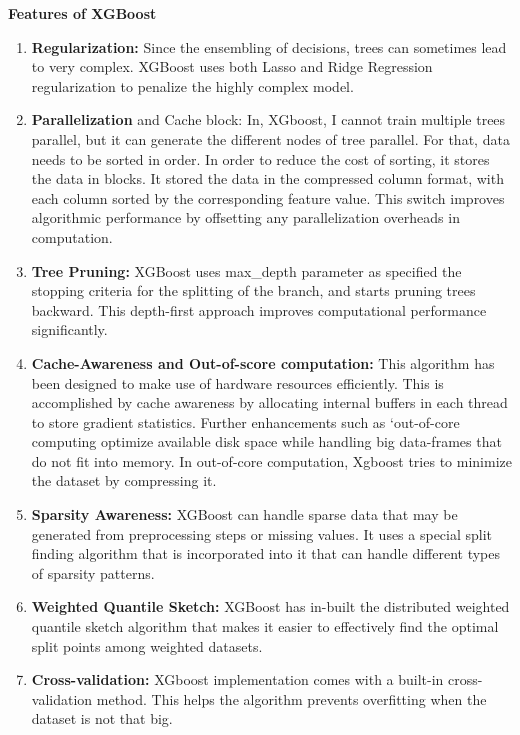 \documentclass[12pt]{article}
\begin{document}
\textbf{Features of XGBoost}
\begin{enumerate}
\item\textbf{Regularization:} Since the ensembling of decisions, trees can sometimes lead to very complex. XGBoost uses both Lasso and Ridge Regression regularization to penalize the highly complex model.
\item\textbf{Parallelization} and Cache block: In, XGboost, I cannot train multiple trees parallel, but it can generate the different nodes of tree parallel. For that, data needs to be sorted in order. In order to reduce the cost of sorting, it stores the data in blocks. It stored the data in the compressed column format, with each column sorted by the corresponding feature value. This switch improves algorithmic performance by offsetting any parallelization overheads in computation.
\item\textbf{Tree Pruning:}  XGBoost uses max\_depth parameter as specified the stopping criteria for the splitting of the branch, and starts pruning trees backward. This depth-first approach improves computational performance significantly.
\item\textbf{Cache-Awareness and Out-of-score computation:} This algorithm has been designed to make use of hardware resources efficiently. This is accomplished by cache awareness by allocating internal buffers in each thread to store gradient statistics. Further enhancements such as ‘out-of-core computing optimize available disk space while handling big data-frames that do not fit into memory. In out-of-core computation, Xgboost tries to minimize the dataset by compressing it.
\item\textbf{Sparsity Awareness:} XGBoost can handle sparse data that may be generated from preprocessing steps or missing values. It uses a special split finding algorithm that is incorporated into it that can handle different types of sparsity patterns.
\item\textbf{Weighted Quantile Sketch:} XGBoost has in-built the distributed weighted quantile sketch algorithm that makes it easier to effectively find the optimal split points among weighted datasets.
\item\textbf{Cross-validation:} XGboost implementation comes with a built-in cross-validation method. This helps the algorithm prevents overfitting when the dataset is not that big.
\end{enumerate}
\end{document}
